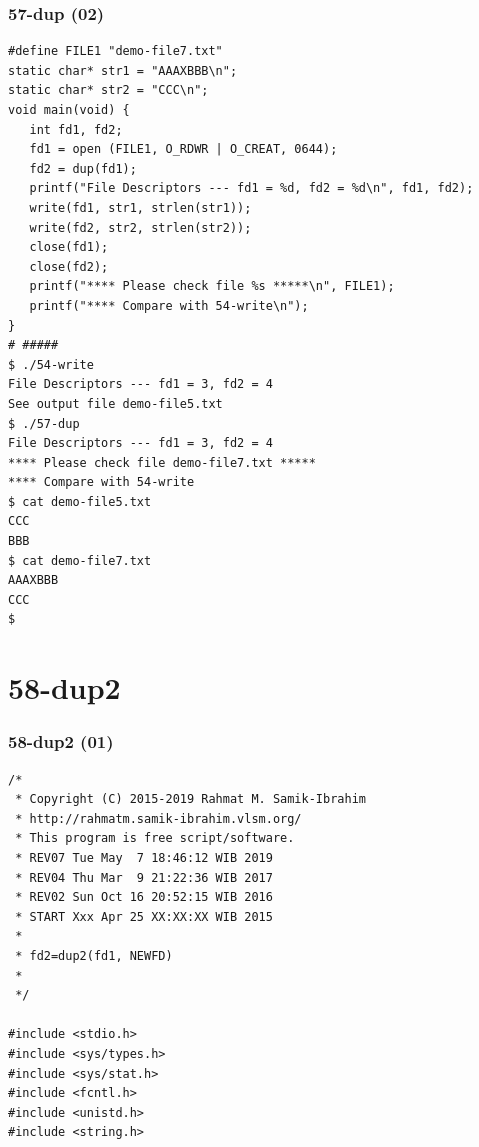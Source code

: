 \documentclass[aspectratio=169, xcolor=table, notheorems, hyperref={pdfpagelabels=false}]{beamer}
\begin{document}
\begin{frame}[fragile]
\frametitle{57-dup (02)}
\begin{lstlisting}[basicstyle=\ttfamily\tiny]
#define FILE1 "demo-file7.txt"
static char* str1 = "AAAXBBB\n";
static char* str2 = "CCC\n";
void main(void) {
   int fd1, fd2;
   fd1 = open (FILE1, O_RDWR | O_CREAT, 0644);
   fd2 = dup(fd1);
   printf("File Descriptors --- fd1 = %d, fd2 = %d\n", fd1, fd2);
   write(fd1, str1, strlen(str1));
   write(fd2, str2, strlen(str2));
   close(fd1);
   close(fd2);
   printf("**** Please check file %s *****\n", FILE1);
   printf("**** Compare with 54-write\n");
}
# #####
$ ./54-write 
File Descriptors --- fd1 = 3, fd2 = 4
See output file demo-file5.txt
$ ./57-dup 
File Descriptors --- fd1 = 3, fd2 = 4
**** Please check file demo-file7.txt *****
**** Compare with 54-write
$ cat demo-file5.txt 
CCC
BBB
$ cat demo-file7.txt 
AAAXBBB
CCC
$ 

\end{lstlisting}
\end{frame}

\section{58-dup2}
\begin{frame}[fragile]
\frametitle{58-dup2 (01)}
\begin{lstlisting}[basicstyle=\ttfamily\footnotesize]
/*
 * Copyright (C) 2015-2019 Rahmat M. Samik-Ibrahim
 * http://rahmatm.samik-ibrahim.vlsm.org/
 * This program is free script/software. 
 * REV07 Tue May  7 18:46:12 WIB 2019
 * REV04 Thu Mar  9 21:22:36 WIB 2017
 * REV02 Sun Oct 16 20:52:15 WIB 2016
 * START Xxx Apr 25 XX:XX:XX WIB 2015
 *
 * fd2=dup2(fd1, NEWFD)
 *
 */

#include <stdio.h>
#include <sys/types.h>
#include <sys/stat.h>
#include <fcntl.h>
#include <unistd.h>
#include <string.h>

\end{lstlisting}
\end{frame}
\end{document}
